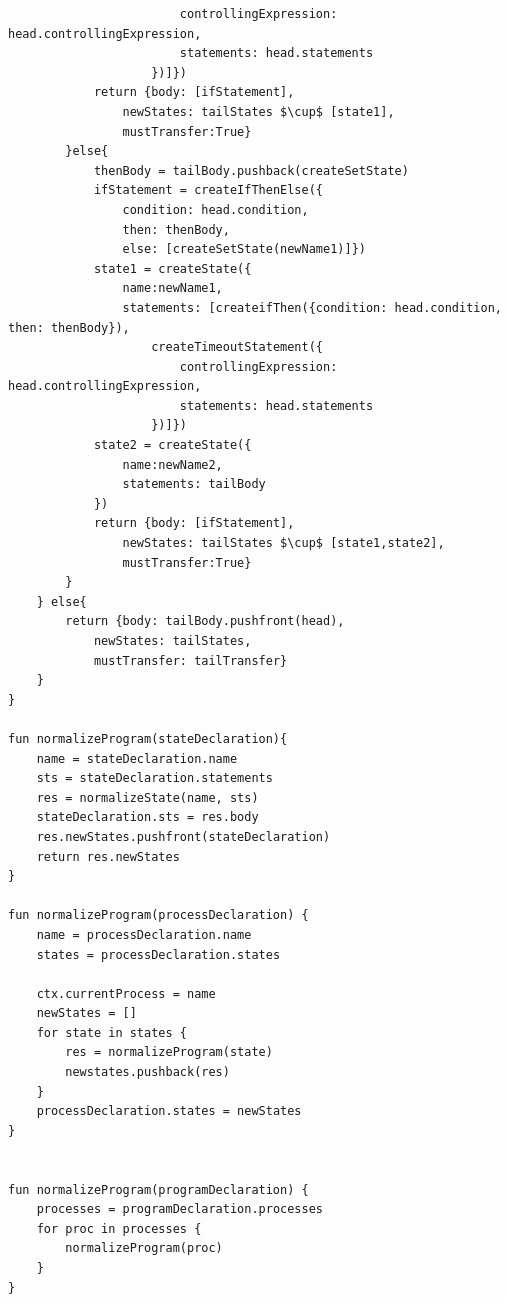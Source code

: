 \begin{lstlisting}
                        controllingExpression: head.controllingExpression,
                        statements: head.statements
                    })]})
            return {body: [ifStatement],
                newStates: tailStates $\cup$ [state1],
                mustTransfer:True}
        }else{
            thenBody = tailBody.pushback(createSetState)
            ifStatement = createIfThenElse({
                condition: head.condition, 
                then: thenBody, 
                else: [createSetState(newName1)]})
            state1 = createState({
                name:newName1, 
                statements: [createifThen({condition: head.condition, then: thenBody}),
                    createTimeoutStatement({
                        controllingExpression: head.controllingExpression,
                        statements: head.statements
                    })]})
            state2 = createState({
                name:newName2,
                statements: tailBody
            })
            return {body: [ifStatement],
                newStates: tailStates $\cup$ [state1,state2],
                mustTransfer:True} 
        }
    } else{
        return {body: tailBody.pushfront(head),
            newStates: tailStates,
            mustTransfer: tailTransfer}
    }
}

fun normalizeProgram(stateDeclaration){
    name = stateDeclaration.name
    sts = stateDeclaration.statements
    res = normalizeState(name, sts)
    stateDeclaration.sts = res.body
    res.newStates.pushfront(stateDeclaration)
    return res.newStates
}

fun normalizeProgram(processDeclaration) {
    name = processDeclaration.name
    states = processDeclaration.states

    ctx.currentProcess = name
    newStates = []
    for state in states {
        res = normalizeProgram(state)
        newstates.pushback(res)
    }
    processDeclaration.states = newStates
}


fun normalizeProgram(programDeclaration) {
    processes = programDeclaration.processes
    for proc in processes {
        normalizeProgram(proc)
    }
}
\end{lstlisting}

